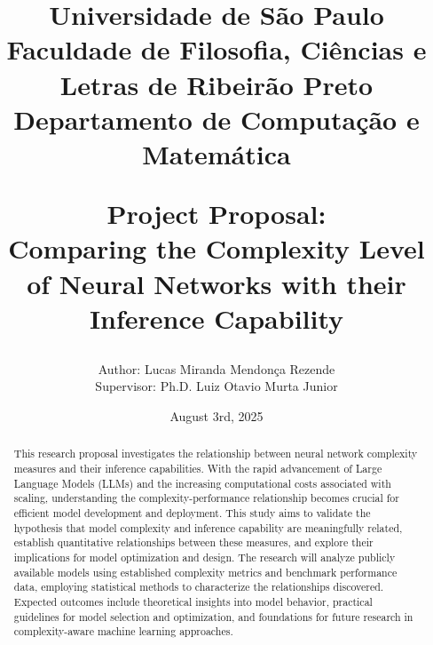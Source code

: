 \documentclass[12pt,a4paper]{article}
\title{
    {\small 
        Universidade de São Paulo\\
        Faculdade de Filosofia, Ciências e Letras de Ribeirão Preto\\
        Departamento de Computação e Matemática\\[1cm]
    }

    \vspace*{\fill}
    Project Proposal:\\
    Comparing the Complexity Level of Neural Networks with their Inference Capability
    \vspace*{\fill}
}
\author{
    Author: Lucas Miranda Mendonça Rezende\\ 
    Supervisor: Ph.D. Luiz Otavio Murta Junior
}
\date{August 3rd, 2025}
\begin{document}
        \maketitle

    \newpage
        \vspace*{\fill}
            \begin{abstract}
                This research proposal investigates the relationship between neural network complexity measures and their inference capabilities. With the rapid advancement of Large Language Models (LLMs) and the increasing computational costs associated with scaling, understanding the complexity-performance relationship becomes crucial for efficient model development and deployment. This study aims to validate the hypothesis that model complexity and inference capability are meaningfully related, establish quantitative relationships between these measures, and explore their implications for model optimization and design. The research will analyze publicly available models using established complexity metrics and benchmark performance data, employing statistical methods to characterize the relationships discovered. Expected outcomes include theoretical insights into model behavior, practical guidelines for model selection and optimization, and foundations for future research in complexity-aware machine learning approaches.
            \end{abstract}
        \vspace*{\fill}

    \newpage
        \tableofcontents

    \newpage
    

    \newpage
    

    \newpage
    

    \newpage
    

    \newpage
    
\end{document}

